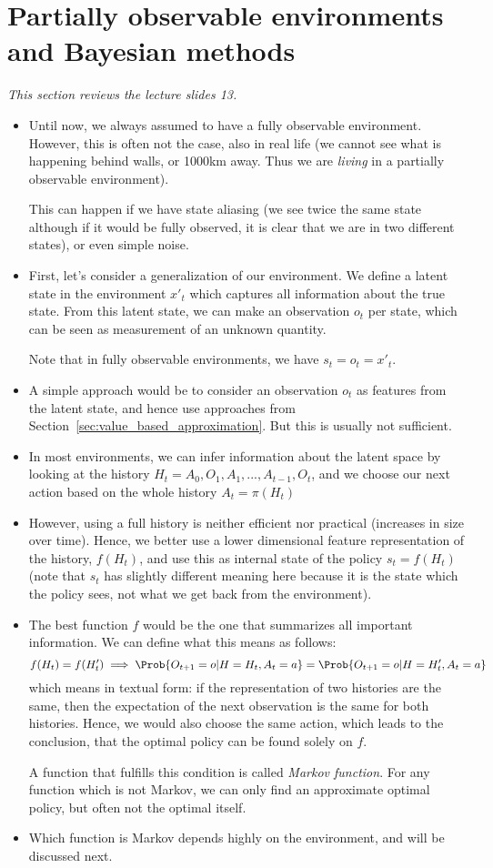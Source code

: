 \section{Partially observable environments and Bayesian methods}
\label{sec:partially_observable}
\textit{This section reviews the lecture slides 13.}
\begin{itemize}
	\item Until now, we always assumed to have a fully observable environment. However, this is often not the case, also in real life (we cannot see what is happening behind walls, or 1000km away. Thus we are \textit{living} in a partially observable environment).
	
	This can happen if we have state aliasing (we see twice the same state although if it would be fully observed, it is clear that we are in two different states), or even simple noise.
	\item First, let's consider a generalization of our environment. We define a latent state in the environment $x'_t$ which captures all information about the true state. From this latent state, we can make an observation $o_t$ per state, which can be seen as measurement of an unknown quantity.
	
	Note that in fully observable environments, we have $s_t=o_t=x'_t$.
	\item A simple approach would be to consider an observation $o_t$ as features from the latent state, and hence use approaches from Section~\ref{sec:value_based_approximation}. But this is usually not sufficient.
	\item In most environments, we can infer information about the latent space by looking at the history $H_t=A_0,O_1,A_1,...,A_{t-1},O_t$, and we choose our next action based on the whole history $A_t=\pi(H_t)$
	\item However, using a full history is neither efficient nor practical (increases in size over time). Hence, we better use a lower dimensional feature representation of the history, $f(H_t)$, and use this as internal state of the policy $s_t = f(H_t)$ (note that $s_t$ has slightly different meaning here because it is the state which the policy sees, not what we get back from the environment).
	\item The best function $f$ would be the one that summarizes all important information. We can define what this means as follows:
	$$f(H_t)=f(H'_t)\implies \Prob{O_{t+1}=o|H=H_t,A_t=a}=\Prob{O_{t+1}=o|H=H'_t,A_t=a}$$
	which means in textual form: if the representation of two histories are the same, then the expectation of the next observation is the same for both histories. Hence, we would also choose the same action, which leads to the conclusion, that the optimal policy can be found solely on $f$.
	
	A function that fulfills this condition is called \textit{Markov function}. For any function which is not Markov, we can only find an approximate optimal policy, but often not the optimal itself.
	\item Which function is Markov depends highly on the environment, and will be discussed next.
\end{itemize}
